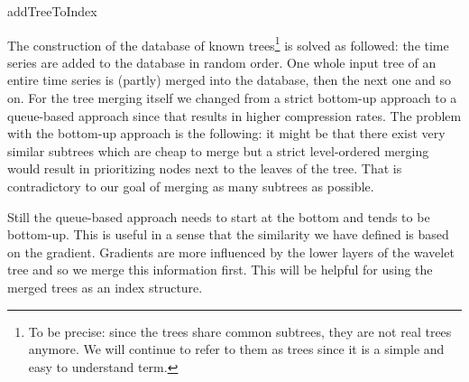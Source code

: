 \begin{algorithm}



    \caption{addTreeToIndex}\label{algo:addTreeToIndex}
\end{algorithm}

The construction of the database of known trees\footnote{To be precise: since the trees share common subtrees, they are not real trees anymore. We will continue to refer to them as trees since it is a simple and easy to understand term.} is solved as followed: the time series are added to the database in random order. One whole input tree of an entire time series is (partly) merged into the database, then the next one and so on. For the tree merging itself we changed from a strict bottom-up approach to a queue-based approach since that results in higher compression rates. The problem with the bottom-up approach is the following: it might be that there exist very similar subtrees which are cheap to merge but a strict level-ordered merging would result in prioritizing nodes next to the leaves of the tree. That is contradictory to our goal of merging as many subtrees as possible.

Still the queue-based approach needs to start at the bottom and tends to be bottom-up. This is useful in a sense that the similarity we have defined is based on the gradient. Gradients are more influenced by the lower layers of the wavelet tree and so we merge this information first. This will be helpful for using the merged trees as an index structure.

